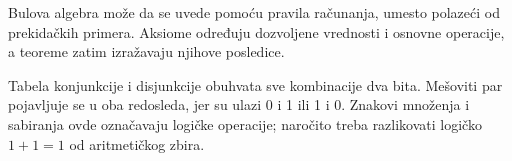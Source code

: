 
Bulova algebra može da se uvede pomoću pravila računanja, umesto polazeći od prekidačkih primera. Aksiome određuju dozvoljene vrednosti i osnovne operacije, a teoreme zatim izražavaju njihove posledice.

Tabela konjunkcije i disjunkcije obuhvata sve kombinacije dva bita. Mešoviti par pojavljuje se u oba redosleda, jer su ulazi 0 i 1 ili 1 i 0. Znakovi množenja i sabiranja ovde označavaju logičke operacije; naročito treba razlikovati logičko \(1+1=1\) od aritmetičkog zbira.
